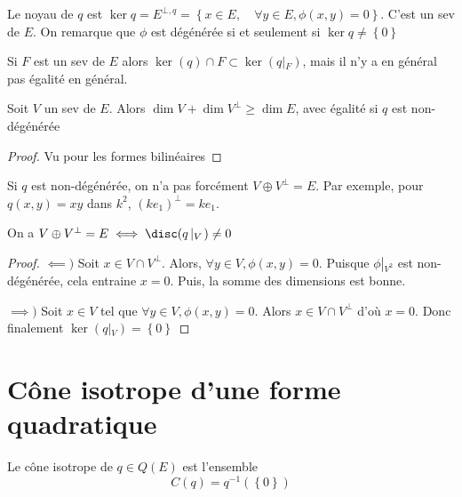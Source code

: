 \begin{dfn}
    Le noyau de $q$ est  $\ker q=E^{\bot,q}= \left\{ x \in  E, \quad  \forall  y \in  E, \phi(x, y)=0 \right\} $. C'est un sev de $E$. On remarque que  $\phi$ est dégénérée  si et seulement si $\ker q\neq \left\{ 0 \right\} $
\end{dfn}

\begin{rem}
Si $F$ est un sev de $E$ alors $\ker (q)\cap F\subset \ker (q\left|_{F}\right.)$, mais il n'y a en général pas égalité en général.
\end{rem}

\begin{prop}
    Soit $V$ un sev de  $E$. Alors  $\dim V+\dim V^\bot \geq \dim E$, avec égalité si $q$ est non-dégénérée
\end{prop}

\begin{proof}
Vu pour les formes bilinéaires
\end{proof}

\begin{rem}
    Si $q$ est non-dégénérée, on n'a pas forcément  $V\oplus V^\bot=E$. Par exemple, pour  $q(x, y)=xy$ dans $k^2$,  $(ke_1)^\bot=ke_1$.
\end{rem}

\begin{prop}
On a $V\oplus V^\bot =E \iff  \disc(q\left|_{V}\right.)\neq 0$
\end{prop}

\begin{proof}
$\impliedby )$ Soit $x \in  V\cap V^\bot$. Alors, $\forall  y \in  V, \phi(x, y)=0$. Puisque $\phi\left|_{V^2}\right.$ est non-dégénérée, cela entraine $x=0$. Puis, la somme des dimensions est bonne.

$\implies )$ Soit $x \in  V$ tel que $\forall  y \in  V, \phi(x, y)=0$. Alors $x \in  V\cap V^\bot$ d'où $x=0$. Donc finalement  $\ker (q\left|_{V}\right.)= \left\{ 0 \right\} $
\end{proof}

\section{Cône isotrope d'une forme quadratique}

\begin{dfn}
    Le cône isotrope de $q \in  Q(E)$ est l'ensemble \[
        C(q)= q^{-1}(\left\{ 0 \right\} )
    \]
\end{dfn}

